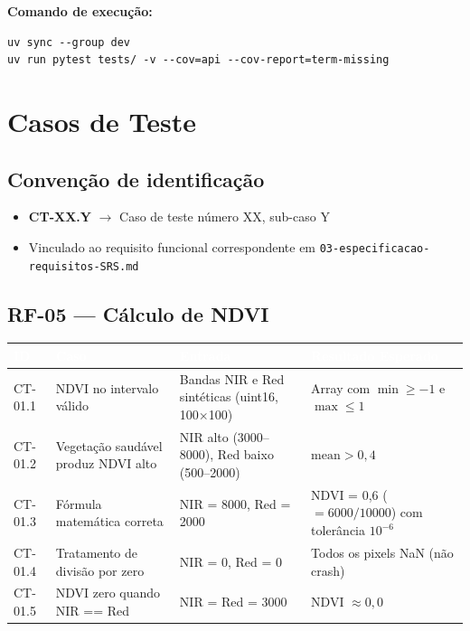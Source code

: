 \documentclass[11pt, a4paper]{article}
\begin{document}
\textbf{Comando de execução:}

\begin{lstlisting}[style=shellstyle]
uv sync --group dev
uv run pytest tests/ -v --cov=api --cov-report=term-missing
\end{lstlisting}

\section{Casos de Teste}

\subsection*{Convenção de identificação}

\begin{itemize}
  \item \textbf{CT-XX.Y} $\rightarrow$ Caso de teste número XX, sub-caso Y
  \item Vinculado ao requisito funcional correspondente em \texttt{03-especificacao-requisitos-SRS.md}
\end{itemize}

\subsection{RF-05 --- Cálculo de NDVI}

\renewcommand{\arraystretch}{1.4}
\begin{table}[H]
\centering
\footnotesize
{}
\begin{tabularx}{\textwidth}{@{}p{1.5cm}p{3.5cm}p{3.5cm}X@{}}
\toprule
\rowcolor{tabheader}\textcolor{white}{\textbf{ID}} & \textcolor{white}{\textbf{Caso}} & \textcolor{white}{\textbf{Entrada}} & \textcolor{white}{\textbf{Resultado Esperado}}\\
\midrule
CT-01.1 & NDVI no intervalo válido & Bandas NIR e Red sintéticas (uint16, 100$\times$100) & Array com $\min \geq -1$ e $\max \leq 1$\\
CT-01.2 & Vegetação saudável produz NDVI alto & NIR alto (3000--8000), Red baixo (500--2000) & $\mathrm{mean} > 0{,}4$\\
CT-01.3 & Fórmula matemática correta & NIR = 8000, Red = 2000 & NDVI = 0{,}6 ($= 6000/10000$) com tolerância $10^{-6}$\\
CT-01.4 & Tratamento de divisão por zero & NIR = 0, Red = 0 & Todos os pixels NaN (não crash)\\
CT-01.5 & NDVI zero quando NIR == Red & NIR = Red = 3000 & NDVI $\approx 0{,}0$\\
\bottomrule
\end{tabularx}
\end{table}
\end{document}
